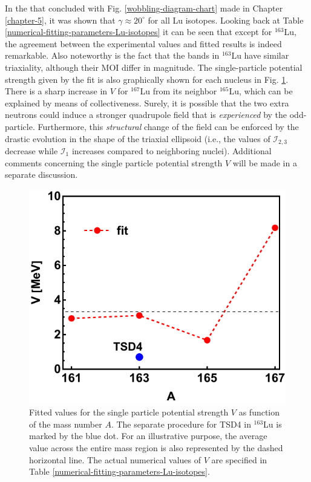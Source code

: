 In the that concluded with Fig. \ref{wobbling-diagram-chart} made in Chapter \ref{chapter-5}, it was shown that $\gamma\approx 20^\circ$ for all Lu isotopes. Looking back at Table \ref{numerical-fitting-parameters-Lu-isotopes} it can be seen that except for $^{163}$Lu, the agreement between the experimental values and fitted results is indeed remarkable. Also noteworthy is the fact that the bands in $^{163}$Lu have similar triaxiality, although their MOI differ in magnitude. The single-particle potential strength given by the fit is also graphically shown for each nucleus in Fig. \ref{fig-V-param-fitting-procedure}. There is a sharp increase in $V$ for $^{167}$Lu from its neighbor $^{165}$Lu, which can be explained by means of collectiveness. Surely, it is possible that the two extra neutrons could induce a stronger quadrupole field that is \emph{experienced} by the odd-particle. Furthermore, this \emph{structural} change of the field can be enforced by the drastic evolution in the shape of the triaxial ellipsoid (i.e., the values of $\mathcal{I}_{2,3}$ decrease while $\mathcal{I}_1$ increases compared to neighboring nuclei). Additional comments concerning the single particle potential strength $V$ will be made in a separate discussion.
\begin{figure}
    \centering
    \includegraphics[scale=0.8]{Chapters/Figures/V-param-fitting.pdf}
    \caption{Fitted values for the single particle potential strength $V$ as function of the mass number $A$. The separate procedure for TSD4 in $^{163}$Lu is marked by the blue dot. For an illustrative purpose, the average value across the entire mass region is also represented by the dashed horizontal line. The actual numerical values of $V$ are specified in Table \ref{numerical-fitting-parameters-Lu-isotopes}.}
    \label{fig-V-param-fitting-procedure}
\end{figure}


